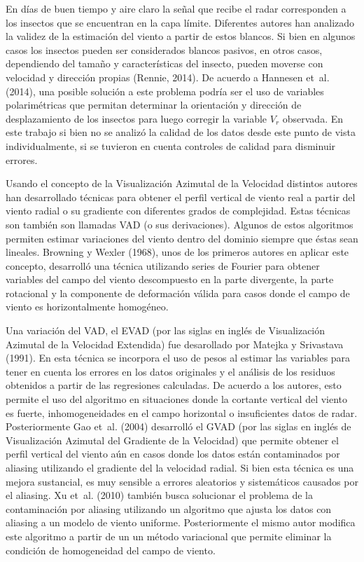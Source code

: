 \documentclass[12pt,spanish,oneside, a4paper]{book}
\begin{document}
En días de buen tiempo y aire claro la señal que recibe el radar
corresponden a los insectos que se encuentran en la capa límite.
Diferentes autores han analizado la validez de la estimación del viento
a partir de estos blancos. Si bien en algunos casos los insectos pueden
ser considerados blancos pasivos, en otros casos, dependiendo del tamaño
y características del insecto, pueden moverse con velocidad y dirección
propias (Rennie, 2014). De acuerdo a Hannesen et~al. (2014), una posible
solución a este problema podría ser el uso de variables polarimétricas
que permitan determinar la orientación y dirección de desplazamiento de
los insectos para luego corregir la variable \(V_r\) observada. En este
trabajo si bien no se analizó la calidad de los datos desde este punto
de vista individualmente, si se tuvieron en cuenta controles de calidad
para disminuir errores.

Usando el concepto de la Visualización Azimutal de la Velocidad
distintos autores han desarrollado técnicas para obtener el perfil
vertical de viento real a partir del viento radial o su gradiente con
diferentes grados de complejidad. Estas técnicas son también son
llamadas VAD (o sus derivaciones). Algunos de estos algoritmos permiten
estimar variaciones del viento dentro del dominio siempre que éstas sean
lineales. Browning y Wexler (1968), unos de los primeros autores en
aplicar este concepto, desarrolló una técnica utilizando series de
Fourier para obtener variables del campo del viento descompuesto en la
parte divergente, la parte rotacional y la componente de deformación
válida para casos donde el campo de viento es horizontalmente homogéneo.

Una variación del VAD, el EVAD (por las siglas en inglés de
Visualización Azimutal de la Velocidad Extendida) fue desarollado por
Matejka y Srivastava (1991). En esta técnica se incorpora el uso de
pesos al estimar las variables para tener en cuenta los errores en los
datos originales y el análisis de los residuos obtenidos a partir de las
regresiones calculadas. De acuerdo a los autores, esto permite el uso
del algoritmo en situaciones donde la cortante vertical del viento es
fuerte, inhomogeneidades en el campo horizontal o insuficientes datos de
radar. Posteriormente Gao et~al. (2004) desarrolló el GVAD (por las
siglas en inglés de Visualización Azimutal del Gradiente de la
Velocidad) que permite obtener el perfil vertical del viento aún en
casos donde los datos están contaminados por aliasing utilizando el
gradiente del la velocidad radial. Si bien esta técnica es una mejora
sustancial, es muy sensible a errores aleatorios y sistemáticos causados
por el aliasing. Xu et~al. (2010) también busca solucionar el problema
de la contaminación por aliasing utilizando un algoritmo que ajusta los
datos con aliasing a un modelo de viento uniforme. Posteriormente el
mismo autor modifica este algoritmo a partir de un un método variacional
que permite eliminar la condición de homogeneidad del campo de viento.
\end{document}
